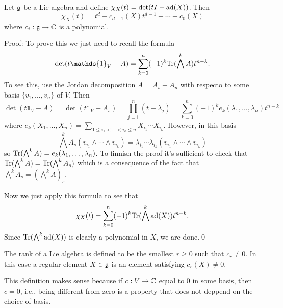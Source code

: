 \begin{dang}
    \begin{lemma}
        Let $\mathfrak{g}$ be a Lie algebra and define $\chi_X(t)=\det(tI-\text{ad}(X))$. Then
        \begin{equation}
            \chi_X(t)=t^d+c_{d-1}(X)t^{d-1}+\cdots+c_0(X)
        \end{equation}
        where $c_i:\mathfrak{g}\to\mathbb{C}$ is a polynomial.
    \end{lemma}
\end{dang}
Proof: To prove this we just need to recall the formula 
\begin{equation}
    \det(t\mathds{1}_V-A)=\sum_{k=0}^n(-1)^k\Tr(\bigwedge^kA)t^{n-k}.
\end{equation}
To see this, use the Jordan decomposition $A=A_s+A_n$ with respecto to some basis $\{v_1,\dots,v_n\}$ of $V$. Then 
\begin{equation}
    \det(t\mathds{1}_V-A)=\det(t\mathds{1}_V-A_s)=\prod_{j=1}^n(t-\lambda_j)
    =\sum_{k=0}^n(-1)^ke_k(\lambda_1,\dots,\lambda_n)t^{n-k}
\end{equation}
where $e_k(X_1,\dots,X_n)=\underset{1\leq i_1<\cdots<i_k\leq n}{\sum}X_{i_1}\cdots X_{i_k}$. However, in this basis 
\begin{equation}
    \bigwedge^kA_s(v_{i_1}\wedge\cdots\wedge v_{i_k})=\lambda_{i_1}\cdots\lambda_{i_k}(v_{i_1}\wedge\cdots\wedge v_{i_k})
\end{equation}
so $\text{Tr}(\bigwedge^kA)=e_k(\lambda_1,\dots,\lambda_n)$. To finnish the proof it's sufficient to check that 
$\text{Tr}(\bigwedge^kA)=\text{Tr}(\bigwedge^kA_s)$ which is a consequence of the fact that $\bigwedge^kA_s=(\bigwedge^kA)_s$.\par 

Now we just apply this formula to see that 
\begin{equation}
    \chi_X(t)=\sum_{k=0}^n(-1)^k\text{Tr}(\bigwedge^k\text{ad}(X))t^{n-k}.
\end{equation}
Since $\text{Tr}(\bigwedge^k\text{ad}(X))$ is clearly a polynomial in $X$, we are done.\qed

\begin{dang}
    \begin{definition}
        The rank of a Lie algebra is defined to be the smallest $r\geq0$ such that $c_r\neq0$. In this case
        a regular element $X\in\mathfrak{g}$ is an element satisfying $c_r(X)\neq0$.
    \end{definition}
\end{dang}
This definition makes sense because if $c:V\to\mathbb{C}$ equal to 0 in some basis, then $c=0$, i.e., being different from zero 
is a property that does not deppend on the choice of basis.

